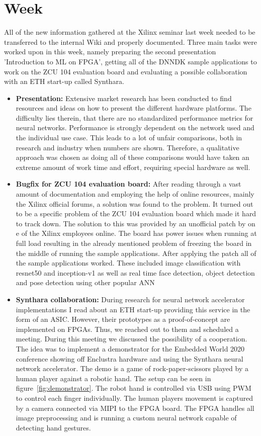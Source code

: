 \chapter{Week}
All of the new information gathered at the Xilinx seminar last week needed to be transferred to the internal Wiki and properly documented. Three main tasks were worked upon in this week, namely preparing the second presentation 'Introduction to \ac{ML} on \ac{FPGA}', getting all of the \ac{DNNDK} sample applications to work on the ZCU 104 evaluation board and evaluating a possible collaboration with an ETH start-up called Synthara.
\begin{itemize}
	\item \textbf{Presentation:} Extensive market research has been conducted to find resources and ideas on how to present the different hardware platforms. The difficulty lies therein, that there are no standardized performance metrics for neural networks. Performance is strongly dependent on the network used and the individual use case. This leads to a lot of unfair comparisons, both in research and industry when numbers are shown. Therefore, a qualitative approach was chosen as doing all of these comparisons would have taken an extreme amount of work time and effort, requiring special hardware as well.
	\item \textbf{Bugfix for ZCU 104 evaluation board:} After reading through a vast amount of documentation and employing the help of online resources, mainly the Xilinx official forums, a solution was found to the problem. It turned out to be a specific problem of the ZCU 104 evaluation board which made it hard to track down. The solution to this was provided by an unofficial patch by on e of the Xilinx employees online. The board has power issues when running at full load resulting in the already mentioned problem of freezing the board in the middle of running the sample applications. After applying the patch all of the sample applications worked. These included image classification with resnet50 and inception-v1 as well as real time face detection, object detection and pose detection using other popular \ac{ANN}
	\item \textbf{Synthara collaboration:} During research for neural network accelerator implementations I read about an ETH start-up providing this service in the form of an \ac{ASIC}. However, their prototypes as a proof-of-concept are implemented on \acp{FPGA}. Thus, we reached out to them and scheduled a meeting. During this meeting we discussed the possibility of a cooperation. The idea was to implement a demonstrator for the Embedded World 2020 conference showing off Enclustra hardware and using the Synthara neural network accelerator. The demo is a game of rock-paper-scissors played by a human player against a robotic hand. The setup can be seen in figure~\ref{fig:demonstrator}. The robot hand is controlled via \ac{USB} using \ac{PWM} to control each finger individually. The human players movement is captured by a camera connected via \ac{MIPI} to the \ac{FPGA} board. The \ac{FPGA} handles all image preprocessing and is running a custom neural network capable of detecting hand gestures.

\end{itemize}
